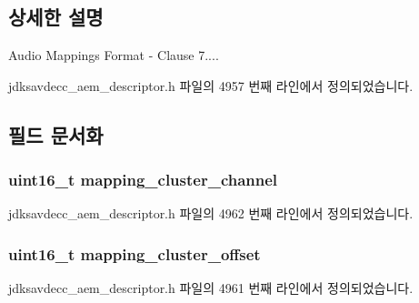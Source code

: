\subsection{상세한 설명}
Audio Mappings Format -\/ Clause 7.... 

jdksavdecc\+\_\+aem\+\_\+descriptor.\+h 파일의 4957 번째 라인에서 정의되었습니다.



\subsection{필드 문서화}
\subsubsection[{\texorpdfstring{mapping\+\_\+cluster\+\_\+channel}{mapping_cluster_channel}}]{\setlength{\rightskip}{0pt plus 5cm}uint16\+\_\+t mapping\+\_\+cluster\+\_\+channel}\hypertarget{structjdksavdecc__audio__mappings__format_af42f86d0c0e308d654bb9519455c7e26}{}\label{structjdksavdecc__audio__mappings__format_af42f86d0c0e308d654bb9519455c7e26}


jdksavdecc\+\_\+aem\+\_\+descriptor.\+h 파일의 4962 번째 라인에서 정의되었습니다.

\subsubsection[{\texorpdfstring{mapping\+\_\+cluster\+\_\+offset}{mapping_cluster_offset}}]{\setlength{\rightskip}{0pt plus 5cm}uint16\+\_\+t mapping\+\_\+cluster\+\_\+offset}\hypertarget{structjdksavdecc__audio__mappings__format_ab57e85d38dacb8e4e841cf9f1fbd7a36}{}\label{structjdksavdecc__audio__mappings__format_ab57e85d38dacb8e4e841cf9f1fbd7a36}


jdksavdecc\+\_\+aem\+\_\+descriptor.\+h 파일의 4961 번째 라인에서 정의되었습니다.

